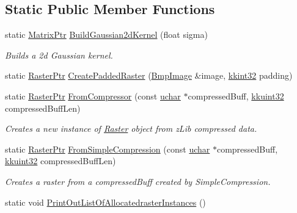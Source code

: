 \subsection*{Static Public Member Functions}
\begin{DoxyCompactItemize}
\item 
static \hyperlink{namespace_k_k_b_a6e7c1ba6b19bffb29c885d2a62e7d235}{Matrix\+Ptr} \hyperlink{class_k_k_b_1_1_raster_ac01c3f7be62b86764ddd044ef7af0b5a}{Build\+Gaussian2d\+Kernel} (float sigma)
\begin{DoxyCompactList}\small\item\em Builds a 2d Gaussian kernel. \end{DoxyCompactList}\item 
static \hyperlink{class_k_k_b_1_1_raster_aefa532857fd6aa9eb53f79da55a97c5a}{Raster\+Ptr} \hyperlink{class_k_k_b_1_1_raster_a80828292a321ed5e829d400b16dd400d}{Create\+Padded\+Raster} (\hyperlink{class_k_k_b_1_1_bmp_image}{Bmp\+Image} \&image, \hyperlink{namespace_k_k_b_a8fa4952cc84fda1de4bec1fbdd8d5b1b}{kkint32} padding)
\item 
static \hyperlink{class_k_k_b_1_1_raster_aefa532857fd6aa9eb53f79da55a97c5a}{Raster\+Ptr} \hyperlink{class_k_k_b_1_1_raster_a9fa3ee3074ada8cca3f5a5b2eb00db9e}{From\+Compressor} (const \hyperlink{namespace_k_k_b_ace9969169bf514f9ee6185186949cdf7}{uchar} $\ast$compressed\+Buff, \hyperlink{namespace_k_k_b_af8d832f05c54994a1cce25bd5743e19a}{kkuint32} compressed\+Buff\+Len)
\begin{DoxyCompactList}\small\item\em Creates a new instance of \hyperlink{class_k_k_b_1_1_raster}{Raster} object from z\+Lib compressed data. \end{DoxyCompactList}\item 
static \hyperlink{class_k_k_b_1_1_raster_aefa532857fd6aa9eb53f79da55a97c5a}{Raster\+Ptr} \hyperlink{class_k_k_b_1_1_raster_ab58d451ba12b799aa65f3b7a9ea69cac}{From\+Simple\+Compression} (const \hyperlink{namespace_k_k_b_ace9969169bf514f9ee6185186949cdf7}{uchar} $\ast$compressed\+Buff, \hyperlink{namespace_k_k_b_af8d832f05c54994a1cce25bd5743e19a}{kkuint32} compressed\+Buff\+Len)
\begin{DoxyCompactList}\small\item\em Creates a raster from a compressed\+Buff created by \textquotesingle{}Simple\+Compression\textquotesingle{}. \end{DoxyCompactList}\item 
static void \hyperlink{class_k_k_b_1_1_raster_ab7d2c23c80e882321a9f8c7baa958899}{Print\+Out\+List\+Of\+Allocatedraster\+Instances} ()
\end{DoxyCompactItemize}
